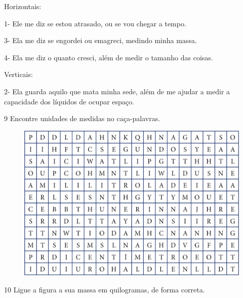 Horizontais:

1- Ele me diz se estou atrasado, ou se vou chegar a tempo.

3- Ela me diz se engordei ou emagreci, medindo minha massa.

4- Ela me diz o quanto cresci, além de medir o tamanho das coisas.

Verticais:

2- Ela guarda aquilo que mata minha sede, além de me ajudar a medir a
capacidade dos líquidos de ocupar espaço.

\num{9} Encontre unidades de medidas no caça-palavras.

\begin{figure}[htpb!]
\includegraphics[width=\textwidth]{./media/image40.png}
\end{figure}


\pagebreak
\num{10} Ligue a figura a sua massa em quilogramas, de forma correta.


